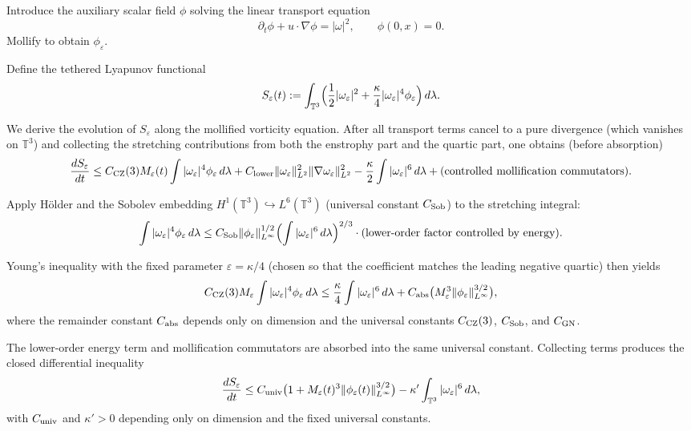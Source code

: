\documentclass[11pt,a4paper]{article}
\begin{document}
Introduce the auxiliary scalar field \(\phi\) solving the linear transport equation
\[
\partial_t \phi + u \cdot \nabla \phi = |\omega|^2, \qquad \phi(0, x) = 0.
\]
Mollify to obtain \(\phi_\varepsilon\).

Define the tethered Lyapunov functional
\[
S_\varepsilon(t) := \int_{\mathbb{T}^3} \Bigl( \frac12 |\omega_\varepsilon|^2 + \frac{\kappa}{4} |\omega_\varepsilon|^4 \phi_\varepsilon \Bigr) \, d\lambda.
\]

We derive the evolution of \(S_\varepsilon\) along the mollified vorticity equation. After all transport terms cancel to a pure divergence (which vanishes on \(\mathbb{T}^3\)) and collecting the stretching contributions from both the enstrophy part and the quartic part, one obtains (before absorption)
\[
\frac{d S_\varepsilon}{dt} \le C_{\rm CZ}(3) M_\varepsilon(t) \int |\omega_\varepsilon|^4 \phi_\varepsilon \, d\lambda + C_{\rm lower} \|\omega_\varepsilon\|_{L^2}^2 \|\nabla \omega_\varepsilon\|_{L^2}^2 - \frac{\kappa}{2} \int |\omega_\varepsilon|^6 \, d\lambda + \text{(controlled mollification commutators)}.
\]

Apply Hölder and the Sobolev embedding \(H^1(\mathbb{T}^3) \hookrightarrow L^6(\mathbb{T}^3)\) (universal constant \(C_{\rm Sob}\)) to the stretching integral:
\[
\int |\omega_\varepsilon|^4 \phi_\varepsilon \, d\lambda \le C_{\rm Sob} \|\phi_\varepsilon\|_{L^\infty}^{1/2} \Bigl( \int |\omega_\varepsilon|^6 \, d\lambda \Bigr)^{2/3} \cdot (\text{lower-order factor controlled by energy}).
\]

Young's inequality with the fixed parameter \(\varepsilon = \kappa/4\) (chosen so that the coefficient matches the leading negative quartic) then yields
\[
C_{\rm CZ}(3) M_\varepsilon \int |\omega_\varepsilon|^4 \phi_\varepsilon \, d\lambda \le \frac{\kappa}{4} \int |\omega_\varepsilon|^6 \, d\lambda + C_{\rm abs} \bigl( M_\varepsilon^3 \|\phi_\varepsilon\|_{L^\infty}^{3/2} \bigr),
\]
where the remainder constant \(C_{\rm abs}\) depends only on dimension and the universal constants \(C_{\rm CZ}(3)\), \(C_{\rm Sob}\), and \(C_{\rm GN}\).

The lower-order energy term and mollification commutators are absorbed into the same universal constant. Collecting terms produces the closed differential inequality
\[
\frac{d S_\varepsilon}{dt} \le C_{\rm univ} \bigl(1 + M_\varepsilon(t)^3 \|\phi_\varepsilon(t)\|_{L^\infty}^{3/2}\bigr) - \kappa' \int_{\mathbb{T}^3} |\omega_\varepsilon|^6 \, d\lambda,
\]
with \(C_{\rm univ}\) and \(\kappa' > 0\) depending only on dimension and the fixed universal constants.
\end{document}
